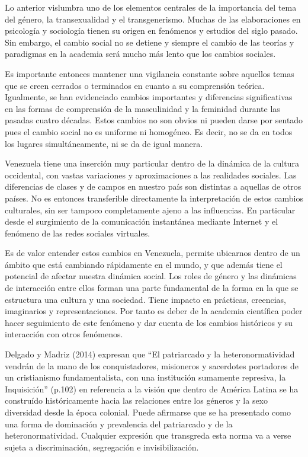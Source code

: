 Lo anterior vislumbra uno de los elementos centrales de la importancia del tema
del género, la transexualidad y el transgenerismo.
Muchas de las elaboraciones en psicología y sociología tienen su origen en
fenómenos y estudios del siglo pasado.
Sin embargo, el cambio social no se detiene y siempre el cambio de las teorías y
paradigmas en la academia será mucho más lento que los cambios sociales.

Es importante entonces mantener una vigilancia constante sobre aquellos temas
que se creen cerrados o terminados en cuanto a su comprensión teórica.
Igualmente, se han evidenciado cambios importantes y diferencias significativas
en las formas de comprensión de la masculinidad y la feminidad durante las
pasadas cuatro décadas.
Estos cambios no son obvios ni pueden darse por sentado pues el cambio social no
es uniforme ni homogéneo.
Es decir, no se da en todos los lugares simultáneamente, ni se da de igual
manera.

Venezuela tiene una inserción muy particular dentro de la dinámica de la cultura
occidental, con vastas variaciones y aproximaciones a las realidades sociales.
Las diferencias de clases y de campos en nuestro país son distintas a aquellas
de otros países.
No es entonces transferible directamente la interpretación de estos cambios
culturales, sin ser tampoco completamente ajeno a las influencias.
En particular desde el surgimiento de la comunicación instantánea mediante
Internet y el fenómeno de las redes sociales virtuales.

Es de valor entender estos cambios en Venezuela, permite ubicarnos dentro de un
ámbito que está cambiando rápidamente en el mundo, y que además tiene el
potencial de afectar nuestra dinámica social.
Los roles de género y las dinámicas de interacción entre ellos forman una parte
fundamental de la forma en la que se estructura una cultura y una sociedad.
Tiene impacto en prácticas, creencias, imaginarios y representaciones.
Por tanto es deber de la academia científica poder hacer seguimiento de este
fenómeno y dar cuenta de los cambios históricos y su interacción con otros
fenómenos.

Delgado y Madriz (2014) expresan que “El patriarcado y la heteronormatividad
vendrán de la mano de los conquistadores, misioneros y sacerdotes portadores de
un cristianismo fundamentalista, con una institución sumamente represiva, la
Inquisición” (p.102) en referencia a la visión que dentro de América Latina se ha construído
históricamente hacia las relaciones entre los géneros y la sexo diversidad desde
la época colonial.
Puede afirmarse que se ha presentado como una forma de dominación y prevalencia
del patriarcado y de la heteronormatividad.
Cualquier expresión que transgreda esta norma va a verse sujeta a
discriminación, segregación e invisibilización.

